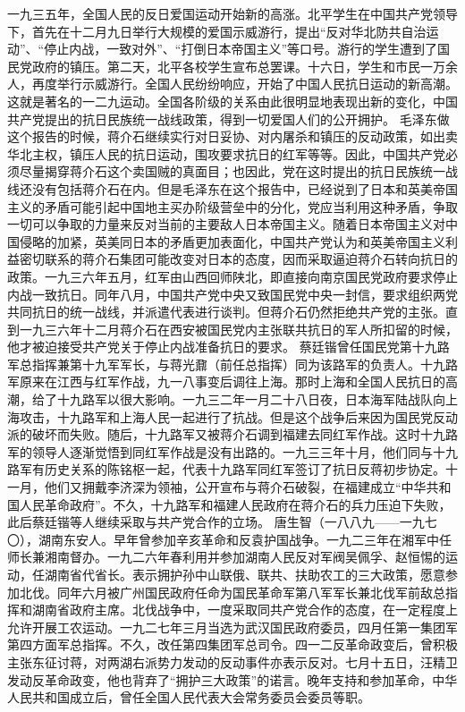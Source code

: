 \begin{maonote}
一九三五年，全国人民的反日爱国运动开始新的高涨。北平学生在中国共产党领导下，首先在十二月九日举行大规模的爱国示威游行，提出“反对华北防共自治运动”、“停止内战，一致对外”、“打倒日本帝国主义”等口号。游行的学生遭到了国民党政府的镇压。第二天，北平各校学生宣布总罢课。十六日，学生和市民一万余人，再度举行示威游行。全国人民纷纷响应，开始了中国人民抗日运动的新高潮。这就是著名的一二九运动。全国各阶级的关系由此很明显地表现出新的变化，中国共产党提出的抗日民族统一战线政策，得到一切爱国人们的公开拥护。
毛泽东做这个报告的时候，蒋介石继续实行对日妥协、对内屠杀和镇压的反动政策，如出卖华北主权，镇压人民的抗日运动，围攻要求抗日的红军等等。因此，中国共产党必须尽量揭穿蒋介石这个卖国贼的真面目；也因此，党在这时提出的抗日民族统一战线还没有包括蒋介石在内。但是毛泽东在这个报告中，已经说到了日本和英美帝国主义的矛盾可能引起中国地主买办阶级营垒中的分化，党应当利用这种矛盾，争取一切可以争取的力量来反对当前的主要敌人日本帝国主义。随着日本帝国主义对中国侵略的加紧，英美同日本的矛盾更加表面化，中国共产党认为和英美帝国主义利益密切联系的蒋介石集团可能改变对日本的态度，因而采取逼迫蒋介石转向抗日的政策。一九三六年五月，红军由山西回师陕北，即直接向南京国民党政府要求停止内战一致抗日。同年八月，中国共产党中央又致国民党中央一封信，要求组织两党共同抗日的统一战线，并派遣代表进行谈判。但蒋介石仍然拒绝共产党的主张。直到一九三六年十二月蒋介石在西安被国民党内主张联共抗日的军人所扣留的时候，他才被迫接受共产党关于停止内战准备抗日的要求。
蔡廷锴曾任国民党第十九路军总指挥兼第十九军军长，与蒋光鼐（前任总指挥）同为该路军的负责人。十九路军原来在江西与红军作战，九一八事变后调往上海。那时上海和全国人民抗日的高潮，给了十九路军以很大影响。一九三二年一月二十八日夜，日本海军陆战队向上海攻击，十九路军和上海人民一起进行了抗战。但是这个战争后来因为国民党反动派的破坏而失败。随后，十九路军又被蒋介石调到福建去同红军作战。这时十九路军的领导人逐渐觉悟到同红军作战是没有出路的。一九三三年十月，他们同与十九路军有历史关系的陈铭枢一起，代表十九路军同红军签订了抗日反蒋初步协定。十一月，他们又拥戴李济深为领袖，公开宣布与蒋介石破裂，在福建成立“中华共和国人民革命政府”。不久，十九路军和福建人民政府在蒋介石的兵力压迫下失败，此后蔡廷锴等人继续采取与共产党合作的立场。
唐生智（一八八九——一九七〇），湖南东安人。早年曾参加辛亥革命和反袁护国战争。一九二三年在湘军中任师长兼湘南督办。一九二六年春利用并参加湖南人民反对军阀吴佩孚、赵恒惕的运动，任湖南省代省长。表示拥护孙中山联俄、联共、扶助农工的三大政策，愿意参加北伐。同年六月被广州国民政府任命为国民革命军第八军军长兼北伐军前敌总指挥和湖南省政府主席。北伐战争中，一度采取同共产党合作的态度，在一定程度上允许开展工农运动。一九二七年三月当选为武汉国民政府委员，四月任第一集团军第四方面军总指挥。不久，改任第四集团军总司令。四一二反革命政变后，曾积极主张东征讨蒋，对两湖右派势力发动的反动事件亦表示反对。七月十五日，汪精卫发动反革命政变，他也背弃了“拥护三大政策”的诺言。晚年支持和参加革命，中华人民共和国成立后，曾任全国人民代表大会常务委员会委员等职。

\end{maonote}
